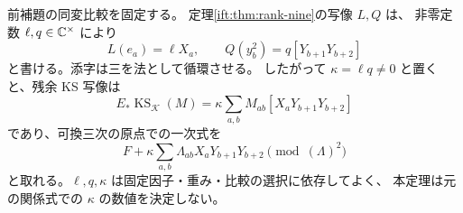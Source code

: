 \begin{theorem}
\label{ife:thm:projective-coefficients}
前補題の同変比較を固定する。
定理\ref{ift:thm:rank-nine}の写像 $L,Q$ は、
非零定数 $\ell,q\in\mathbb C^\times$ により
\begin{equation}\label{ife:eq:projective-coefficients}
       L(e_a)=\ell X_a,\qquad
       Q(y_b^2)=q[Y_{b+1}Y_{b+2}]
\end{equation}
と書ける。添字は三を法として循環させる。
したがって $\kappa=\ell q\ne0$ と置くと、残余 KS 写像は
\begin{equation}\label{ife:eq:explicit-ks}
 E_*\operatorname{KS}_{\mathcal K}(M)
       =\kappa\sum_{a,b}M_{ab}[X_aY_{b+1}Y_{b+2}]
\end{equation}
であり、可換三次の原点での一次式を
\begin{equation}\label{ife:eq:explicit-first-jet}
  F+\kappa\sum_{a,b}\Lambda_{ab}X_aY_{b+1}Y_{b+2}
           \pmod{(\Lambda)^2}
\end{equation}
と取れる。$\ell,q,\kappa$ は固定因子・重み・比較の選択に依存してよく、
本定理は元の関係式での $\kappa$ の数値を決定しない。
\end{theorem}

